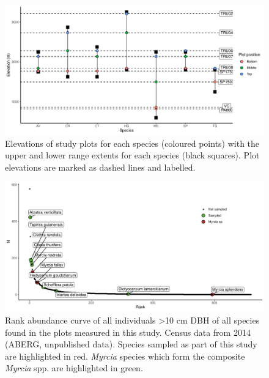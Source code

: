 \documentclass[a4paper, 11pt]{article}
\begin{document}

\begin{figure}[H]
\includegraphics[width=\textwidth]{ranges}
\centering
\caption{Elevations of study plots for each species (coloured points) with the upper and lower range extents for each species (black squares). Plot elevations are marked as dashed lines and labelled.}
\label{ranges}
\end{figure}




\begin{figure}[H]
\includegraphics[width=\textwidth]{rank_abund}
\centering
\caption{Rank abundance curve of all individuals \textgreater{}10 cm DBH of all species found in the plots measured in this study. Census data from 2014 (ABERG, unpublished data). Species sampled as part of this study are highlighted in red. \textit{Myrcia} species which form the composite \textit{Myrcia} spp. are highlighted in green.}
\label{rank_abund}
\end{figure}
\end{document}
